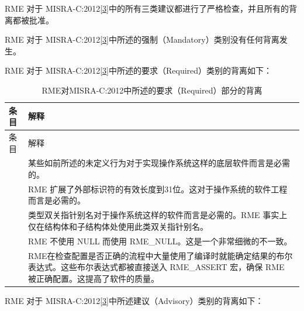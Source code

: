 RME 对于 MISRA-C:2012\hyperref[cite:9-3]{{[}3{]}}中的所有三类建议都进行了严格检查，并且所有的背离都被批准。

RME 对于 MISRA-C:2012\hyperref[cite:9-3]{{[}3{]}}中所述的强制（Mandatory）类别没有任何背离发生。

RME 对于 MISRA-C:2012\hyperref[cite:9-3]{{[}3{]}}中所述的要求（Required）类别的背离如下：

\begin{xltabular}{\textwidth}{@{}>{\hsize\raggedright\arraybackslash}X>{\hsize\raggedright\arraybackslash}X@{}}
\caption{RME对MISRA-C:2012中所述的要求（Required）部分的背离}\label{tab:9-6-misra-required-deviations}\\
\toprule
条目 & 解释\tabularnewline
\endfirsthead
\toprule
条目 & 解释\tabularnewline
\midrule
\endhead
\bottomrule
{} &
某些如前所述的未定义行为对于实现操作系统这样的底层软件而言是必需的。 &
RME 扩展了外部标识符的有效长度到31位。这对于操作系统的软件工程而言是必需的。 &
类型双关指针别名对于操作系统这样的软件而言是必需的。RME 事实上仅在结构体和子结构体处使用此类双关指针别名。 & RME 不使用 NULL 而使用 RME\_NULL。这是一个非常细微的不一致。 &
RME在检查配置是否正确的流程中大量使用了编译时就能确定结果的布尔表达式。这些布尔表达式都被直接送入 RME\_ASSERT 宏，确保 RME 被正确配置。这提高了软件的质量。\tabularnewline
\end{xltabular}

RME 对于 MISRA-C:2012\hyperref[cite:9-3]{{[}3{]}}中所述建议（Advisory）类别的背离如下：

